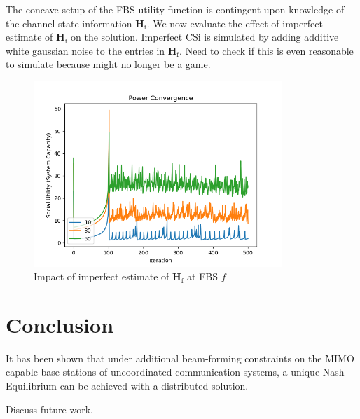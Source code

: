 \documentclass[12pt,a4paper]{report}
\begin{document}
The concave setup of the FBS utility function is contingent upon knowledge of the channel state information $\mathbf{H}_{\text{f}}$. We now evaluate the effect of imperfect estimate of $\mathbf{H}_{\text{f}}$ on the solution. Imperfect CSi is simulated by adding additive white gaussian noise to the entries in $\mathbf{H}_{\text{f}}$. Need to check if this is even reasonable to simulate because might no longer be a game. 

\begin{figure}[H]
	  	\includegraphics[width=\textwidth,height = 7cm]{figures/increasing_antenna_game_beamformer}
	  		  \caption{Impact of imperfect estimate of $\mathbf{H}_{\text{f}}$ at FBS $f$}
	  \label{fig:inc_fc}
\end{figure}


\chapter{Conclusion}
It has been shown that under additional beam-forming constraints on the MIMO capable base stations of uncoordinated communication systems, a unique Nash Equilibrium can be achieved with a distributed solution. 

Discuss future work. 

\newpage

\end{document}
